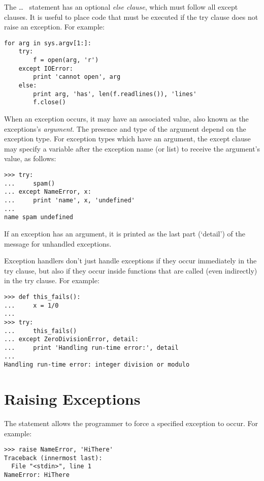 \documentclass{manual}
\begin{document}
The  \ldots\  statement has an optional
\emph{else clause}, which must follow all except clauses.  It is
useful to place code that must be executed if the try clause does not
raise an exception.  For example:

\begin{verbatim}
for arg in sys.argv[1:]:
    try:
        f = open(arg, 'r')
    except IOError:
        print 'cannot open', arg
    else:
        print arg, 'has', len(f.readlines()), 'lines'
        f.close()
\end{verbatim}


When an exception occurs, it may have an associated value, also known as
the exceptions's \emph{argument}.
The presence and type of the argument depend on the exception type.
For exception types which have an argument, the except clause may
specify a variable after the exception name (or list) to receive the
argument's value, as follows:

\begin{verbatim}
>>> try:
...     spam()
... except NameError, x:
...     print 'name', x, 'undefined'
... 
name spam undefined
\end{verbatim}

If an exception has an argument, it is printed as the last part
(`detail') of the message for unhandled exceptions.

Exception handlers don't just handle exceptions if they occur
immediately in the try clause, but also if they occur inside functions
that are called (even indirectly) in the try clause.
For example:

\begin{verbatim}
>>> def this_fails():
...     x = 1/0
... 
>>> try:
...     this_fails()
... except ZeroDivisionError, detail:
...     print 'Handling run-time error:', detail
... 
Handling run-time error: integer division or modulo
\end{verbatim}


\section{Raising Exceptions \label{raising}}

The  statement allows the programmer to force a
specified exception to occur.
For example:

\begin{verbatim}
>>> raise NameError, 'HiThere'
Traceback (innermost last):
  File "<stdin>", line 1
NameError: HiThere
\end{verbatim}
\end{document}
